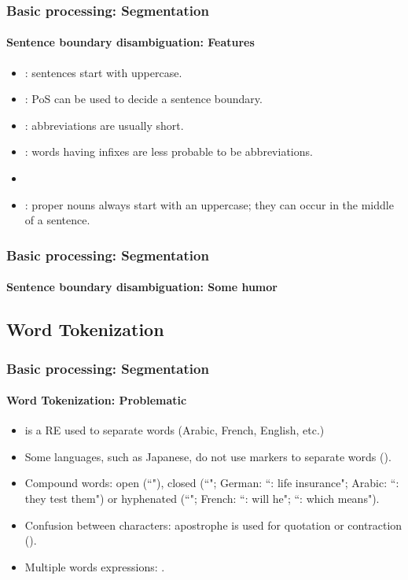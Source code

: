 \documentclass[xcolor=table]{beamer}
\begin{document}
\begin{frame}
\frametitle{Basic processing: Segmentation}
\framesubtitle{Sentence boundary disambiguation: Features} 

\begin{itemize}
	\item {}: sentences start with uppercase.
	\item {}: PoS can be used to decide a sentence boundary.
	\item {}: abbreviations are usually short.
	\item {}: words having infixes are less probable to be abbreviations.
	\item {} 
	\item {}: proper nouns always start with an uppercase; they can occur in the middle of a sentence.
\end{itemize}

\end{frame}

\begin{frame}
\frametitle{Basic processing: Segmentation}
\framesubtitle{Sentence boundary disambiguation: Some humor} 


\begin{center}
\end{center}

\end{frame}

\subsection{Word Tokenization}

\begin{frame}
\frametitle{Basic processing: Segmentation}
\framesubtitle{Word Tokenization: Problematic} 


\begin{itemize}
	\item \expword{/[ ]+/} is a RE used to separate words (Arabic, French, English, etc.)
	\item Some languages, such as Japanese, do not use markers to separate words ().
	\item Compound words: open (``"), closed (``"; German: ``: life insurance"; Arabic: ``: they test them") or hyphenated (``"; French: ``: will he"; ``: which means").
	\item Confusion between characters: apostrophe is used for quotation or contraction ().
	\item Multiple words expressions: .
\end{itemize}

\end{frame}
\end{document}
